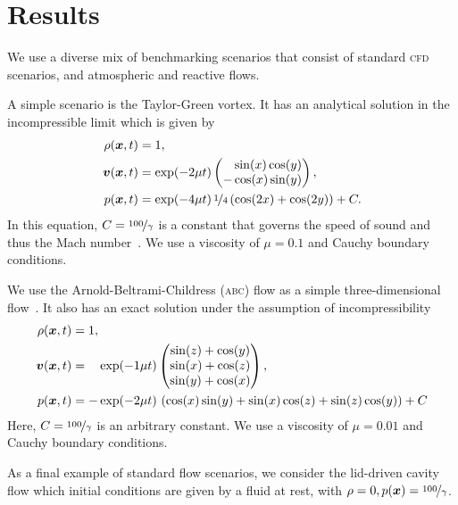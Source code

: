 \documentclass[runningheads]{llncs}
\begin{document}
\section{Results}
We use a diverse mix of benchmarking scenarios that consist of standard \textsc{cfd} scenarios, and atmospheric and reactive flows.

A simple scenario is the Taylor-Green vortex.
It has an analytical solution in the incompressible limit which is given by
\begin{align}
  \label{eq:taylor-green}
  \begin{split}
  \rho(\bm{x}, t) &= 1,\\
  \bm{v}(\bm{x}, t) &= \exp(-2 \mu t)
  \begin{pmatrix}
    \phantom{-}\sin(x) \cos(y) \\
- \cos(x) \sin(y) 
    \end{pmatrix}, \\
  p(\bm{x}, t) &= \exp(-4 \mu t) \, \nicefrac{1}{4} \left( \cos(2x) + \cos(2y) \right) + C.
  \end{split}
\end{align}
In this equation, $C = \nicefrac{100}{\gamma}$ is a constant that governs the speed of sound and thus the Mach number~\cite{dumbser2016high}.
We use a viscosity of $\mu = 0.1$ and Cauchy boundary conditions.

We use the Arnold-Beltrami-Childress (\textsc{abc}) flow as a simple three-dimensional flow~\cite{tavelli2016staggered}.
It also has an exact solution under the assumption of incompressibility
\begin{align}
  \label{eq:abc-flow}
  \begin{split}
  \rho(\bm{x}, t) &= 1,\\
  \bm{v}(\bm{x}, t) &= \phantom{-} \exp(-1\mu t)
  \begin{pmatrix}
    \sin(z) + \cos(y)\\
    \sin(x) + \cos(z)\\
    \sin(y) + \cos(x)
  \end{pmatrix}, \\
  p(\bm{x}, t) &= -\exp(-2 \mu t) \, \left(\cos(x)\sin(y) + \sin(x)\cos(z) + \sin(z)\cos(y)\right)
  + C
  \end{split}
\end{align}
Here, $C = \nicefrac{100}{\gamma}$ is an arbitrary constant.
We use a viscosity of $\mu = 0.01$ and Cauchy boundary conditions.

As a final example of standard flow scenarios, we consider the lid-driven cavity flow which initial conditions are given by a fluid at rest, with $\rho = 0, p(\bm{x}) = \nicefrac{100}{\gamma}$.
\end{document}
